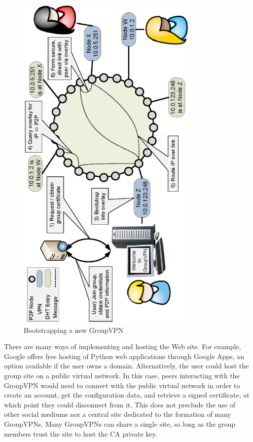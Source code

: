 \begin{figure}[ht]
\centering
\includegraphics[width=3.5in,angle=-90]{figs/groupvpn.ps}
\caption[Bootstrapping a new GroupVPN]{Bootstrapping a new GroupVPN}
\label{fig:groupvpn}
\end{figure}

There are many ways of implementing and hosting the Web site.  For example,
Google offers free hosting of Python web applications through Google Apps, an
option available if the user owns a domain.  Alternatively, the user could host
the group site on a public virtual network. In this case, peers interacting
with the GroupVPN would need to connect with the public virtual network in
order to create an account, get the configuration data, and retrieve a signed
certificate, at which point they could disconnect from it.  This does not
preclude the use of other social mediums nor a central site dedicated to the
formation of many GroupVPNs.  Many GroupVPNs can share a single site, so long
as the group members trust the site to host the CA private key.

